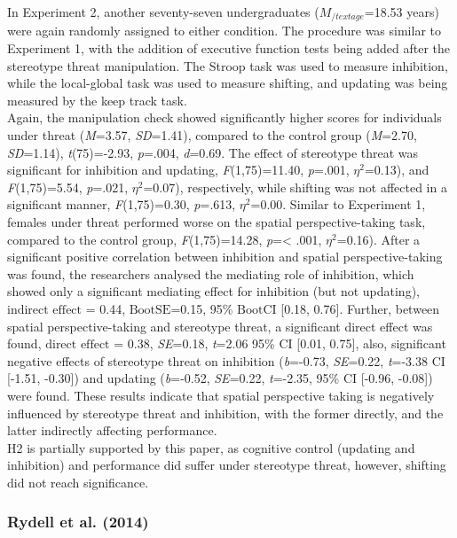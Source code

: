 \documentclass[
  stu,floatsintext]{apa7}
\begin{document}
In Experiment 2, another seventy-seven undergraduates (\(M_{/text{age}}\)=18.53 years) were again randomly assigned to either condition.
The procedure was similar to Experiment 1, with the addition of executive function tests being added after the stereotype threat manipulation.
The Stroop task was used to measure inhibition, while the local-global task was used to measure shifting, and updating was being measured by the keep track task.\\
Again, the manipulation check showed significantly higher scores for individuals under threat (\emph{M}=3.57, \emph{SD}=1.41), compared to the control group (\emph{M}=2.70, \emph{SD}=1.14), \emph{t}(75)=-2.93, \emph{p}=.004, \emph{d}=0.69.
The effect of stereotype threat was significant for inhibition and updating, \emph{F}(1,75)=11.40, \emph{p}=.001, \(\eta^{2}\)=0.13), and \emph{F}(1,75)=5.54, \emph{p}=.021, \(\eta^{2}\)=0.07), respectively, while shifting was not affected in a significant manner, \emph{F}(1,75)=0.30, \emph{p}=.613, \(\eta^2\)=0.00.
Similar to Experiment 1, females under threat performed worse on the spatial perspective-taking task, compared to the control group, \emph{F}(1,75)=14.28, \emph{p}=\textless{} .001, \(\eta^{2}\)=0.16).
After a significant positive correlation between inhibition and spatial perspective-taking was found, the researchers analysed the mediating role of inhibition, which showed only a significant mediating effect for inhibition (but not updating), \(\text{indirect effect}\) = 0.44, \(\text{BootSE}\)=0.15, 95\% \(\text{BootCI}\) {[}0.18, 0.76{]}.
Further, between spatial perspective-taking and stereotype threat, a significant direct effect was found, \(\text{direct effect}\) = 0.38, \emph{SE}=0.18, \emph{t}=2.06 95\% \(\text{CI}\) {[}0.01, 0.75{]}, also, significant negative effects of stereotype threat on inhibition (\emph{b}=-0.73, \emph{SE}=0.22, \emph{t}=-3.38 CI {[}-1.51, -0.30{]}) and updating (\emph{b}=-0.52, \emph{SE}=0.22, \emph{t}=-2.35, 95\% CI {[}-0.96, -0.08{]}) were found.
These results indicate that spatial perspective taking is negatively influenced by stereotype threat and inhibition, with the former directly, and the latter indirectly affecting performance.\\
H2 is partially supported by this paper, as cognitive control (updating and inhibition) and performance did suffer under stereotype threat, however, shifting did not reach significance.

\subsubsection{Rydell et al. (2014)}\label{rydellstereotypethreatexecutive2014}
\end{document}
